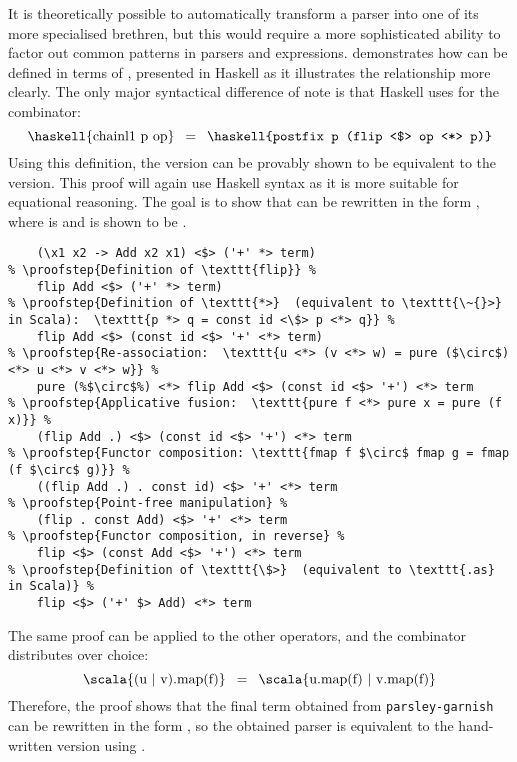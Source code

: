 \documentclass[../../main.tex]{subfiles}
\begin{document}
It is theoretically possible to automatically transform a  parser into one of its more specialised brethren, but this would require a more sophisticated ability to factor out common patterns in parsers and expressions.
\textcite{willis_parsley_2024} demonstrates how  can be defined in terms of , presented in Haskell as it illustrates the relationship more clearly.
The only major syntactical difference of note is that Haskell uses \haskell{<$>} for the  combinator:
\begin{equation*}
\text{\haskell{chainl1 p op}} \enspace = \enspace \text{\haskell{postfix p (flip <$> op <*> p)}}
\end{equation*}
%
Using this definition, the  version can be provably shown to be equivalent to the  version.
This proof will again use Haskell syntax as it is more suitable for equational reasoning.
The goal is to show that  can be rewritten in the form , where  is  and  is shown to be .
\begin{lstlisting}
    (\x1 x2 -> Add x2 x1) <$> ('+' *> term)
% \proofstep{Definition of \texttt{flip}} %
    flip Add <$> ('+' *> term)
% \proofstep{Definition of \texttt{*>}  (equivalent to \texttt{\~{}>} in Scala):  \texttt{p *> q = const id <\$> p <*> q}} %
    flip Add <$> (const id <$> '+' <*> term)
% \proofstep{Re-association:  \texttt{u <*> (v <*> w) = pure ($\circ$) <*> u <*> v <*> w}} %
    pure (%$\circ$%) <*> flip Add <$> (const id <$> '+') <*> term
% \proofstep{Applicative fusion:  \texttt{pure f <*> pure x = pure (f x)}} %
    (flip Add .) <$> (const id <$> '+') <*> term
% \proofstep{Functor composition: \texttt{fmap f $\circ$ fmap g = fmap (f $\circ$ g)}} %
    ((flip Add .) . const id) <$> '+' <*> term
% \proofstep{Point-free manipulation} %
    (flip . const Add) <$> '+' <*> term
% \proofstep{Functor composition, in reverse} %
    flip <$> (const Add <$> '+') <*> term
% \proofstep{Definition of \texttt{\$>}  (equivalent to \texttt{.as} in Scala)} %
    flip <$> ('+' $> Add) <*> term
\end{lstlisting}
%
The same proof can be applied to the other operators, and the  combinator distributes over choice:
\begin{equation*}
\text{\scala{(u | v).map(f)}} \enspace = \enspace \text{\scala{u.map(f) | v.map(f)}}
\end{equation*}
%
Therefore, the proof shows that the final term obtained from \texttt{parsley-garnish} can be rewritten in the form , so the obtained  parser is equivalent to the hand-written version using .
\end{document}
